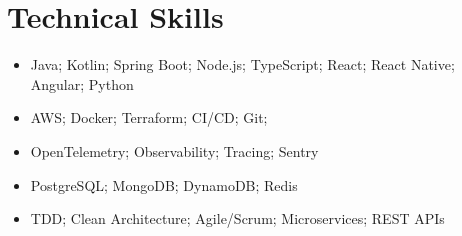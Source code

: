 \documentclass[10pt, a4paper]{article}
\begin{document}
    
    \section{Technical Skills}

        \begin{itemize}[leftmargin=*, itemsep=0pt]
          \item Java; Kotlin; Spring Boot; Node.js; TypeScript; React; React Native; Angular; Python
          \item AWS; Docker; Terraform; CI/CD; Git;
          \item OpenTelemetry; Observability; Tracing; Sentry
          \item PostgreSQL; MongoDB; DynamoDB; Redis
          \item TDD; Clean Architecture; Agile/Scrum; Microservices; REST APIs
        \end{itemize}
    
\end{document}
